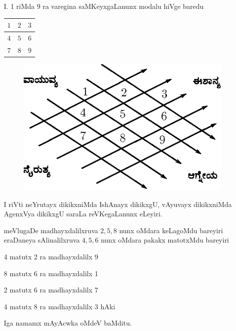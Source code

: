 \begin{enumerate}
\item[{\rm I.}] {\rm 1} riMda {\rm 9} ra varegina saMKeyxgaLanunx modalu hiVge baredu

\begin{center}
\begin{tabular}{|>{$}c<{$}|>{$}c<{$}|>{$}c<{$}|}
\hline
1 & 2 & 3\\
\hline
4 & 5 & 6\\
\hline
7 & 8 & 9\\
\hline
\end{tabular}
\end{center}

\begin{figure}[H]
\centering
\includegraphics[scale=.8]{src/figures/m_116.eps}
\end{figure}

I riVti neYrutayx dikikxniMda IshAnayx dikikxgU, vAyuvayx dikikxniMda AgenxVya dikikxgU saraLa reVKegaLanunx eLeyiri.

meVlugaDe madhayxdalilxruva $2, 5, 8$ nunx oMdara keLagoMdu bareyiri eraDaneya sAlinalilxruva $4, 5, 6$ nunx oMdara pakakx matotxMdu bareyiri

{\rm 4} matutx {\rm 2} ra madhayxdalilx {\rm 9}

{\rm 8} matutx {\rm 6} ra madhayxdalilx {\rm 1}

{\rm 2} matutx {\rm 6} ra madhayxdalilx {\rm 7}

{\rm 4} matutx {\rm 8} ra madhayxdalilx {\rm 3} hAki

Iga namamx mAyAcwka oMdeV baMditu.

\begin{center}
%
\end{center}


\end{enumerate}
